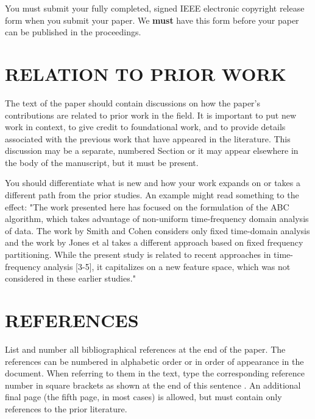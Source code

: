 \documentclass[letterpaper, 11 pt, twoside, conference]{ieeeconf}
\begin{document}
You must submit your fully completed, signed IEEE electronic copyright release
form when you submit your paper. We {\bf must} have this form before your paper
can be published in the proceedings.

\section{RELATION TO PRIOR WORK}
\label{sec:prior}

The text of the paper should contain discussions on how the paper's
contributions are related to prior work in the field. It is important
to put new work in  context, to give credit to foundational work, and
to provide details associated with the previous work that have appeared
in the literature. This discussion may be a separate, numbered Section
or it may appear elsewhere in the body of the manuscript, but it must
be present.

You should differentiate what is new and how your work expands on
or takes a different path from the prior studies. An example might
read something to the effect: "The work presented here has focused
on the formulation of the ABC algorithm, which takes advantage of
non-uniform time-frequency domain analysis of data. The work by
Smith and Cohen  considers only fixed time-domain analysis and
the work by Jones et al  takes a different approach based on
fixed frequency partitioning. While the present study is related
to recent approaches in time-frequency analysis [3-5], it capitalizes
on a new feature space, which was not considered in these earlier
studies."

\vfill\pagebreak

\section{REFERENCES}
\label{sec:refs}

List and number all bibliographical references at the end of the
paper. The references can be numbered in alphabetic order or in
order of appearance in the document. When referring to them in
the text, type the corresponding reference number in square
brackets as shown at the end of this sentence \cite{Chai1999}. An
additional final page (the fifth page, in most cases) is
allowed, but must contain only references to the prior
literature.



\end{document}
